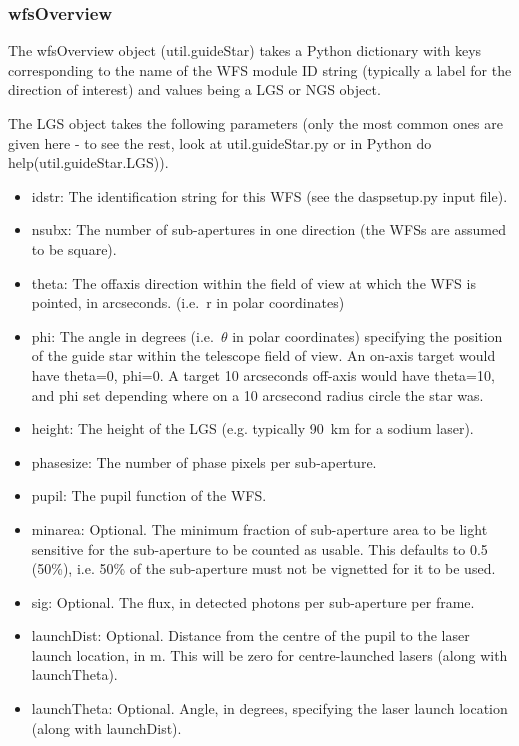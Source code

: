 \documentclass{article}
\begin{document}
\subsubsection{wfsOverview}
The wfsOverview object (util.guideStar) takes a Python dictionary with
keys corresponding to the name of the WFS module ID string (typically
a label for the direction of interest) and values being a LGS or NGS
object.

The LGS object takes the following parameters (only the most common
ones are given here - to see the rest, look at util.guideStar.py or in
Python do help(util.guideStar.LGS)).

\begin{itemize}
\item idstr: The identification string for this WFS (see the
  daspsetup.py input file).
\item nsubx: The number of sub-apertures in one direction (the WFSs
  are assumed to be square).
\item theta: The offaxis direction within the field of view at which
  the WFS is pointed, in arcseconds.  (i.e.\ r in polar coordinates)
\item phi: The angle in degrees (i.e.\ $\theta$ in polar coordinates)
  specifying the position of the guide star within the telescope field
  of view.  An on-axis target would have theta=0, phi=0.  A target 10
  arcseconds off-axis would have theta=10, and phi set depending where
  on a 10 arcsecond radius circle the star was.
\item height: The height of the LGS (e.g. typically 90~km for a sodium
  laser).
\item phasesize: The number of phase pixels per sub-aperture.
\item pupil: The pupil function of the WFS.
\item minarea: Optional.  The minimum fraction of sub-aperture area to be light
  sensitive for the sub-aperture to be counted as usable. This
  defaults to 0.5 (50\%), i.e. 50\% of the sub-aperture must not be
  vignetted for it to be used.  
\item sig: Optional.  The flux, in detected photons per sub-aperture per frame.
\item launchDist: Optional.  Distance from the centre of the pupil to the laser
  launch location, in m.  This will be zero for centre-launched
  lasers (along with launchTheta).
\item launchTheta: Optional.  Angle, in degrees, specifying the laser launch
  location (along with launchDist).

\end{itemize}
\end{document}
